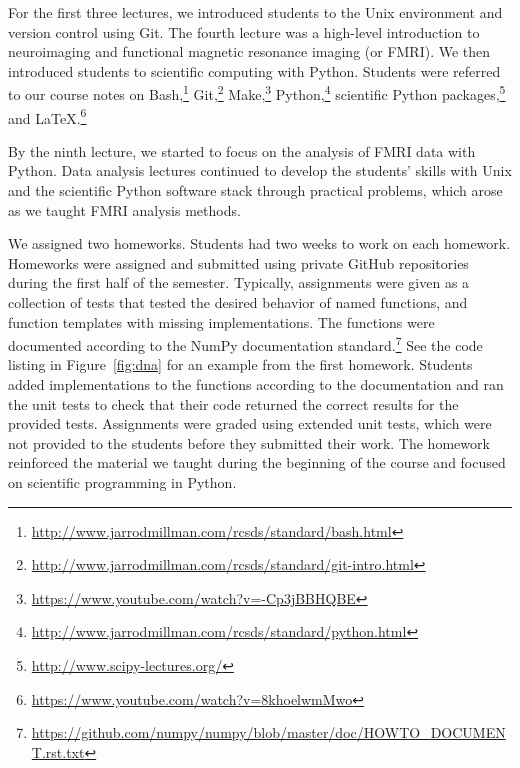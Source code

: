 For the first three lectures, we introduced students to the Unix environment
and version control using Git.
The fourth lecture was a high-level introduction to neuroimaging and
functional magnetic resonance imaging (or FMRI).
We then introduced students to scientific computing with Python.
Students were referred to our course notes on
Bash,\footnote{\url{http://www.jarrodmillman.com/rcsds/standard/bash.html}}
Git,\footnote{\url{http://www.jarrodmillman.com/rcsds/standard/git-intro.html}}
Make,\footnote{\url{https://www.youtube.com/watch?v=-Cp3jBBHQBE}}
Python,\footnote{\url{http://www.jarrodmillman.com/rcsds/standard/python.html}}
scientific Python packages,\footnote{\url{http://www.scipy-lectures.org/}}
and \LaTeX.\footnote{\url{https://www.youtube.com/watch?v=8khoelwmMwo}}

By the ninth lecture, we started to focus on the analysis of FMRI data with
Python.
Data analysis lectures continued to develop the students' skills with
Unix and the scientific Python software stack through practical problems,
which arose as we taught FMRI analysis methods.

We assigned two homeworks.
Students had two weeks to work on each homework.
Homeworks were assigned and submitted using private GitHub repositories  during
the first half of the semester.
Typically, assignments were given as a collection of tests that tested the
desired behavior of named functions, and function templates with missing
implementations.
The functions were documented according to the NumPy documentation
standard.\footnote{\url{https://github.com/numpy/numpy/blob/master/doc/HOWTO_DOCUMENT.rst.txt}}
See the code listing in Figure~\ref{fig:dna} for an example from the first homework.
Students added implementations to the functions according to the documentation
and ran the unit tests to check that their code returned the correct results
for the provided tests.
Assignments were graded using extended unit tests, which were not provided to
the students before they submitted their work.
The homework reinforced the material we taught during the
beginning of the course and focused on scientific programming
in Python.


